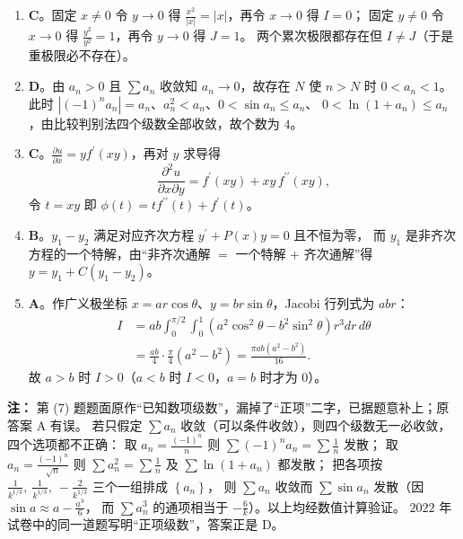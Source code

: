 \begin{enumerate}
{\begin{enumerate}
	\item
	\textbf{C}。固定 $x\neq0$ 令 $y\to0$ 得 $\frac{x^{2}}{|x|}=|x|$，再令 $x\to0$ 得 $I=0$；
	固定 $y\neq0$ 令 $x\to0$ 得 $\frac{y^{2}}{y^{2}}=1$，再令 $y\to0$ 得 $J=1$。
	两个累次极限都存在但 $I\neq J$（于是重极限必不存在）。

	\item
	\textbf{D}。由 $a_n>0$ 且 $\sum a_n$ 收敛知 $a_n\to0$，故存在 $N$ 使 $n>N$ 时 $0<a_n<1$。
	此时 $\left|(-1)^{n}a_n\right|=a_n$、$a_n^{2}<a_n$、$0<\sin a_n\leqslant a_n$、
	$0<\ln\left(1+a_n\right)\leqslant a_n$，由比较判别法四个级数全部收敛，故个数为 $4$。

	\item
	\textbf{C}。$\frac{\partial u}{\partial x}=yf^{\prime}(xy)$，再对 $y$ 求导得
	\[
	\frac{\partial^{2}u}{\partial x\partial y}=f^{\prime}(xy)+xy\,f^{\prime\prime}(xy) ,
	\]
	令 $t=xy$ 即 $\phi(t)=tf^{\prime\prime}(t)+f^{\prime}(t)$。

	\item
	\textbf{B}。$y_1-y_2$ 满足对应齐次方程 $y^{\prime}+P(x)y=0$ 且不恒为零，
	而 $y_1$ 是非齐次方程的一个特解，由“非齐次通解 $=$ 一个特解 $+$ 齐次通解”得
	$y=y_1+C\left(y_1-y_2\right)$。

	\item
	\textbf{A}。作广义极坐标 $x=ar\cos\theta$、$y=br\sin\theta$，Jacobi 行列式为 $abr$：
	\begin{align*}
	I&=ab\int_0^{\pi/2}\!\!\int_0^1\left(a^{2}\cos^{2}\theta-b^{2}\sin^{2}\theta\right)r^{3}dr\,d\theta\\
	&=\frac{ab}{4}\cdot\frac{\pi}{4}\left(a^{2}-b^{2}\right)=\frac{\pi ab\left(a^{2}-b^{2}\right)}{16} .
	\end{align*}
	故 $a>b$ 时 $I>0$（$a<b$ 时 $I<0$，$a=b$ 时才为 $0$）。
\end{enumerate}

	\par\vspace{1mm}\noindent
	\textbf{注：}{\kaishu
	第 (7) 题题面原作“已知数项级数”，漏掉了“正项”二字，已据题意补上；原答案 A 有误。
	若只假定 $\sum a_n$ 收敛（可以条件收敛），则四个级数无一必收敛，四个选项都不正确：
	取 $a_n=\frac{(-1)^{n}}{n}$ 则 $\sum(-1)^{n}a_n=\sum\frac1n$ 发散；
	取 $a_n=\frac{(-1)^{n}}{\sqrt n}$ 则 $\sum a_n^{2}=\sum\frac1n$ 及
	$\sum\ln\left(1+a_n\right)$ 都发散；
	把各项按 $\frac{1}{k^{1/3}},\ \frac{1}{k^{1/3}},\ -\frac{2}{k^{1/3}}$ 三个一组排成 $\left\{a_n\right\}$，
	则 $\sum a_n$ 收敛而 $\sum\sin a_n$ 发散（因 $\sin a\approx a-\frac{a^{3}}{6}$，
	而 $\sum a_n^{3}$ 的通项相当于 $-\frac6k$）。以上均经数值计算验证。
	$2022$ 年试卷中的同一道题写明“正项级数”，答案正是 D。
	}\par
}



\end{enumerate}
